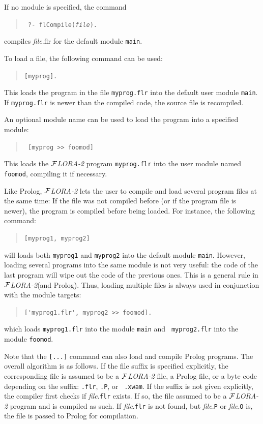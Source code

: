 \documentclass[11pt]{article}
\newcommand{\FLORA}{{\mbox{${\cal F}${\small\it LORA}\rm\emph{-2}}}\xspace}
\newcommand{\ofile}{xwam}
\begin{document}
If no module is specified, the command
\begin{quote}
 \tt
 ?- flCompile({\it file}).
\end{quote}
compiles {\it file}.flr for the default module {\tt main}.


%
To load a file, the following command can be used:
\begin{quote}
 \tt [myprog].  
\end{quote}
This loads the program in the file {\tt myprog.flr} into the default user
module {\tt main}. If {\tt myprog.flr} is newer than the compiled code, the
source file is recompiled.

An optional module name can be used to load the program into a specified
module:
\begin{quote}
  \tt
[myprog >> foomod]
\end{quote}
This loads the \FLORA program {\tt myprog.flr} into the user module named {\tt
  foomod}, compiling it if necessary.

Like Prolog, \FLORA lets the user to compile and load several program
files at the same time: If the file was not compiled before (or if the
program file is newer), the program is compiled before being loaded.  For
instance, the following command:
\begin{quote}
\verb|[myprog1, myprog2]|
\end{quote}
will loads both {\tt myprog1} and {\tt myprog2} into the default module
{\tt main}. However, loading several programs into the same module is not
very useful: the code of the last program will wipe out the code of the
previous ones. This is a general rule in \FLORA (and Prolog). Thus, loading
multiple files is always used in conjunction with the module targets:
\begin{quote}
\verb|['myprog1.flr', myprog2 >> foomod].|
\end{quote}
which loads {\tt myprog1.flr} into the module {\tt main} and {\tt
  myprog2.flr} into the module {\tt foomod}.

Note that the {\tt [...]} command can also load and compile Prolog programs.
The overall algorithm is as follows. If the file suffix is specified
explicitly, the corresponding file is assumed to be a \FLORA file, a Prolog
file, or a byte code depending on the suffix: {\tt .flr}, {\tt .P}, or {\tt
  .\ofile}. If the suffix is not given explicitly, the compiler first checks if
{\it file}.{\tt flr} exists. If so, the file assumed to be a \FLORA program
and is compiled as such. If {\it file}.{\tt flr} is not found, but {\it
  file}.{\tt P} or {\it file}.{\tt O} is, the file is passed to Prolog for
compilation.
\end{document}
